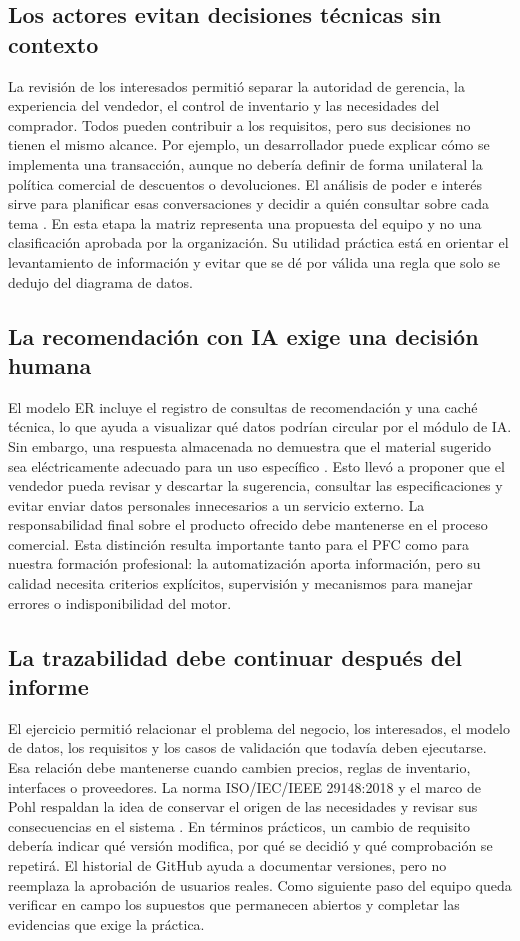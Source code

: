 \subsection{Los actores evitan decisiones técnicas sin contexto}
La revisión de los interesados permitió separar la autoridad de gerencia, la experiencia del vendedor, el control de inventario y las necesidades del comprador. Todos pueden contribuir a los requisitos, pero sus decisiones no tienen el mismo alcance. Por ejemplo, un desarrollador puede explicar cómo se implementa una transacción, aunque no debería definir de forma unilateral la política comercial de descuentos o devoluciones. El análisis de poder e interés sirve para planificar esas conversaciones y decidir a quién consultar sobre cada tema \cite{pmbok2021,pohl2025}. En esta etapa la matriz representa una propuesta del equipo y no una clasificación aprobada por la organización. Su utilidad práctica está en orientar el levantamiento de información y evitar que se dé por válida una regla que solo se dedujo del diagrama de datos.

\subsection{La recomendación con IA exige una decisión humana}
El modelo ER incluye el registro de consultas de recomendación y una caché técnica, lo que ayuda a visualizar qué datos podrían circular por el módulo de IA. Sin embargo, una respuesta almacenada no demuestra que el material sugerido sea eléctricamente adecuado para un uso específico \cite{erPFC2026}. Esto llevó a proponer que el vendedor pueda revisar y descartar la sugerencia, consultar las especificaciones y evitar enviar datos personales innecesarios a un servicio externo. La responsabilidad final sobre el producto ofrecido debe mantenerse en el proceso comercial. Esta distinción resulta importante tanto para el PFC como para nuestra formación profesional: la automatización aporta información, pero su calidad necesita criterios explícitos, supervisión y mecanismos para manejar errores o indisponibilidad del motor.

\subsection{La trazabilidad debe continuar después del informe}
El ejercicio permitió relacionar el problema del negocio, los interesados, el modelo de datos, los requisitos y los casos de validación que todavía deben ejecutarse. Esa relación debe mantenerse cuando cambien precios, reglas de inventario, interfaces o proveedores. La norma ISO/IEC/IEEE 29148:2018 y el marco de Pohl respaldan la idea de conservar el origen de las necesidades y revisar sus consecuencias en el sistema \cite{iso29148,pohl2025}. En términos prácticos, un cambio de requisito debería indicar qué versión modifica, por qué se decidió y qué comprobación se repetirá. El historial de GitHub ayuda a documentar versiones, pero no reemplaza la aprobación de usuarios reales. Como siguiente paso del equipo queda verificar en campo los supuestos que permanecen abiertos y completar las evidencias que exige la práctica.
